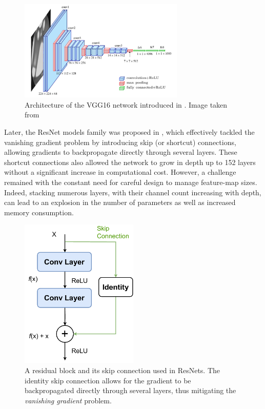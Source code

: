 \begin{figure}[htbp]
  \centering
  \includegraphics[width=0.7\textwidth]{chapter_sota/assets/vgg16.png}
  \caption{Architecture of the VGG16 network introduced in
    \cite{DBLP:journals/corr/SimonyanZ14a}. Image taken from
    \cite{ferguson2017automatic}}
  \label{fig:dlo:vgg16}
\end{figure}

Later, the ResNet models family was proposed in \cite{DBLP:conf/cvpr/HeZRS16},
which effectively tackled the vanishing gradient problem by introducing skip (or
shortcut) connections, allowing gradients to backpropagate directly through
several layers. These shortcut connections also allowed the network to grow in
depth up to 152 layers without a significant increase in computational cost.
However, a challenge remained with the constant need for careful design to
manage feature-map sizes. Indeed, stacking numerous layers, with their channel
count increasing with depth, can lead to an explosion in the number of
parameters as well as increased memory consumption.\\

\begin{figure}[htbp]
  \centering
  \includegraphics[width=0.5\textwidth]{chapter_dlo/assets/skip_connection.pdf}
  \caption{A residual block and its skip connection used in
    ResNets\cite{DBLP:conf/cvpr/HeZRS16}. The identity skip connection allows
    for the gradient to be backpropagated directly through several layers, thus
    mitigating the \emph{vanishing gradient} problem.}
  \label{fig:dlo:skip_connection}
\end{figure}

